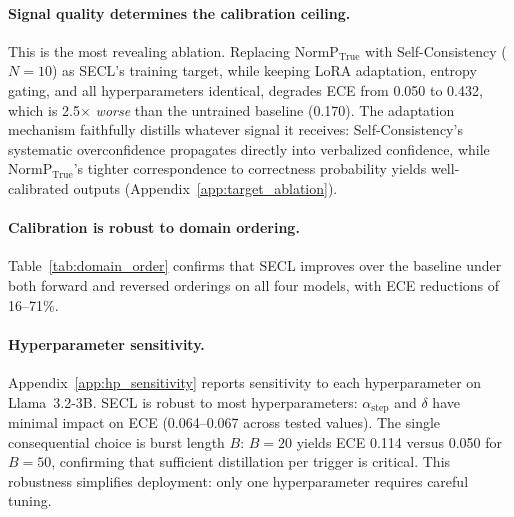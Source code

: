 \documentclass[11pt]{article}
\begin{document}
\paragraph{Signal quality determines the calibration ceiling.}
This is the most revealing ablation. Replacing $\text{NormP}_{\text{True}}$ with Self-Consistency \cite{wang_selfconsistency_2023} ($N{=}10$) as SECL's training target, while keeping LoRA adaptation, entropy gating, and all hyperparameters identical, degrades ECE from 0.050 to 0.432, which is 2.5$\times$ \emph{worse} than the untrained baseline (0.170). The adaptation mechanism faithfully distills whatever signal it receives: Self-Consistency's systematic overconfidence propagates directly into verbalized confidence, while $\text{NormP}_{\text{True}}$'s tighter correspondence to correctness probability yields well-calibrated outputs (Appendix~\ref{app:target_ablation}).

\paragraph{Calibration is robust to domain ordering.}
Table~\ref{tab:domain_order} confirms that SECL improves over the baseline under both forward and reversed orderings on all four models, with ECE reductions of 16--71\%.

\paragraph{Hyperparameter sensitivity.}
Appendix~\ref{app:hp_sensitivity} reports sensitivity to each hyperparameter on Llama~3.2-3B. SECL is robust to most hyperparameters: $\alpha_{\text{step}}$ and $\delta$ have minimal impact on ECE (0.064--0.067 across tested values). The single consequential choice is burst length $B$: $B = 20$ yields ECE 0.114 versus 0.050 for $B = 50$, confirming that sufficient distillation per trigger is critical. This robustness simplifies deployment: only one hyperparameter requires careful tuning.

\begin{table}[!t]
\centering
\small
\setlength{\tabcolsep}{4pt}
\renewcommand{\arraystretch}{1.35}
\caption{Gating strategy ablation (Llama~3.2-3B). Entropy-gated 
bursts achieve comparable ECE to always-on training while 
requiring only 25.6\% of questions.}
\label{tab:gating_ablation}
\vspace{-1em}
\end{table}
\end{document}
